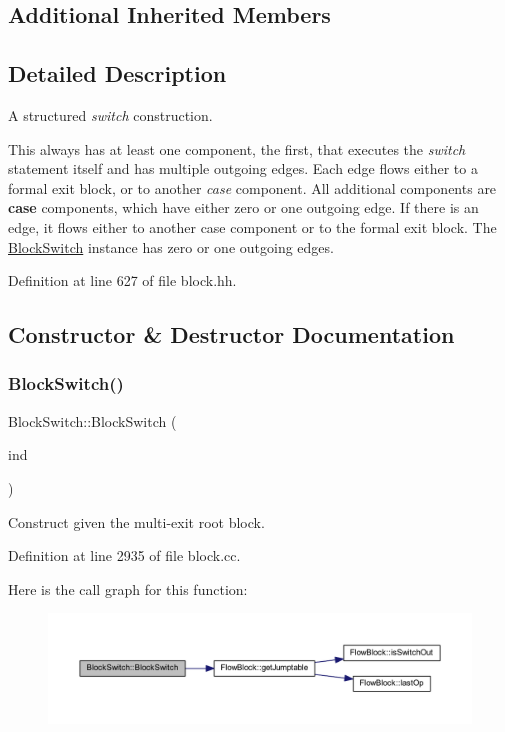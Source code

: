 \subsection*{Additional Inherited Members}


\subsection{Detailed Description}
A structured {\itshape switch} construction. 

This always has at least one component, the first, that executes the {\itshape switch} statement itself and has multiple outgoing edges. Each edge flows either to a formal exit block, or to another {\itshape case} component. All additional components are {\bfseries{case}} components, which have either zero or one outgoing edge. If there is an edge, it flows either to another case component or to the formal exit block. The \mbox{\hyperlink{class_block_switch}{Block\+Switch}} instance has zero or one outgoing edges. 

Definition at line 627 of file block.\+hh.



\subsection{Constructor \& Destructor Documentation}
\mbox{\label{class_block_switch_a9c8ea8ab5e05fa4b6c9244cac89cf5cf}} 
\subsubsection{\texorpdfstring{BlockSwitch()}{BlockSwitch()}}
{\footnotesize\ttfamily Block\+Switch\+::\+Block\+Switch (\begin{DoxyParamCaption}\item[{\mbox{\hyperlink{class_flow_block}{Flow\+Block}} $\ast$}]{ind }\end{DoxyParamCaption})}



Construct given the multi-\/exit root block. 



Definition at line 2935 of file block.\+cc.

Here is the call graph for this function\+:
\nopagebreak
\begin{figure}[H]
\begin{center}
\leavevmode
\includegraphics[width=350pt]{class_block_switch_a9c8ea8ab5e05fa4b6c9244cac89cf5cf_cgraph}
\end{center}
\end{figure}



